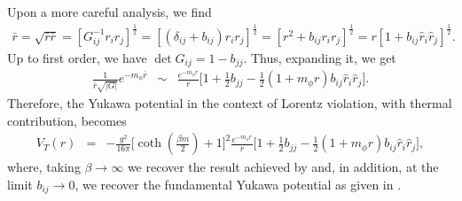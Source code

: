 \documentclass[11pt,showpacs,preprintnumbers,amsmath,amssymb,prd,nofootinbib,superscriptaddress]{revtex4-2}
\begin{document}
{Upon a more careful analysis, we find
\begin{eqnarray}
    \bar{r}=\sqrt{\bar{r}\bar{r}}=\left[G_{ij}^{-1}r_ir_j\right]^{\frac{1}{2}}=\left[\left(\delta_{ij}+b_{ij}\right)r_ir_j\right]^{\frac{1}{2}}=\left[r^2+b_{ij}r_ir_j\right]^{\frac{1}{2}}=r\left[1+b_{ij}\hat{r}_i\hat{r}_j\right]^{\frac{1}{2}}.
\end{eqnarray}
Up to first order, we have $\det{G_{ij}} = 1 - b_{jj}$. Thus, expanding it, we get
\begin{eqnarray}
    \frac{1}{\bar{r}\sqrt{|G|}}e^{-m_\phi\bar{r}}&\sim&%
    \frac{e^{-m_\phi r}}{r}\biggl[1+\frac{1}{2}b_{jj}-\frac{1}{2}(1+m_\phi r)b_{ij}\hat{r}_i\hat{r}_j\biggr].
\end{eqnarray}
Therefore, the Yukawa potential in the context of Lorentz violation, with thermal contribution,  becomes
\begin{eqnarray}
    V_T(r)
    &=&-\frac{g^2}{16\pi}\biggr[\coth{\left(\frac{\beta m}{2}\right)}+1\biggl]^2\frac{e^{-m_\phi r}}{r}\biggl[1+\frac{1}{2}b_{jj}-\frac{1}{2}(1+m_\phi r)b_{ij}\hat{r}_i\hat{r}_j\biggr],\label{eq19}
\end{eqnarray}
where, taking $\beta \to \infty$ we recover the result achieved by \cite{altschul} and, in addition, at the limit $b_{ij} \to 0$, we recover the fundamental Yukawa potential as given in \cite{peskin}.

}
\end{document}
